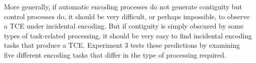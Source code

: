 \documentclass[jou,natbib]{apa6} %
\begin{document}
More generally, if automatic encoding processes do not generate contiguity but control processes do, it should be very difficult, or perhaps impossible, to observe a TCE under incidental encoding. But if contiguity is simply obscured by some types of task-related processing, it should be very easy to find incidental encoding tasks that produce a TCE. Experiment 3 tests these predictions by examining five different encoding tasks that differ in the type of processing required.









\end{document}
